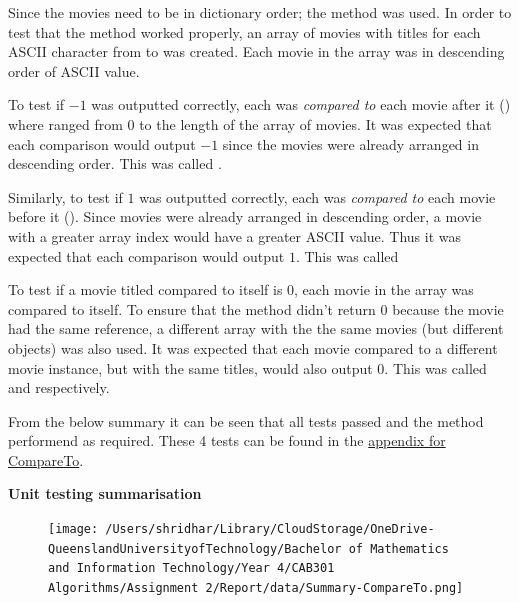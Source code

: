 \documentclass[a4paper]{article}
\begin{document}
\noindent
Since the movies need to be in dictionary order; the  method was used. In order to test that the method worked properly, an array of movies with titles for each ASCII character from  to \codeword{~} was created. Each movie in the array was in descending order of ASCII value. 
\vspace{3mm}

\noindent
To test if $-1$ was outputted correctly, each  was \textit{compared to} each movie after it () where  ranged from $0$ to the length of the array of movies. It was expected that each comparison would output $-1$ since the movies were already arranged in descending order. This was called .
\vspace{3mm}

\noindent
Similarly, to test if $1$ was outputted correctly, each  was \textit{compared to} each movie before it (). Since movies were already arranged in descending order, a movie with a greater array index would have a greater ASCII value. Thus it was expected that each comparison would output $1$. This was called 
\vspace{3mm}

\noindent
To test if a movie titled compared to itself is $0$, each movie in the array was compared to itself. To ensure that the method didn't return $0$ because the movie had the same reference, a different array with the the same movies (but different objects) was also used. It was expected that each movie compared to a different movie instance, but with the same titles, would also output $0$. This was called  and  respectively. 
\vspace{1mm}

\noindent
From the below summary it can be seen that all tests passed and the method performend as required. These 4 tests can be found in the \hyperlink{subsubsection.5.1.1}{appendix for CompareTo}.
\vspace{3mm}

\noindent
\textbf{Unit testing summarisation}
\begin{figure}[H]
   \texttt{[image: /Users/shridhar/Library/CloudStorage/OneDrive-QueenslandUniversityofTechnology/Bachelor of Mathematics and Information Technology/Year 4/CAB301 Algorithms/Assignment 2/Report/data/Summary-CompareTo.png]}
\end{figure}
\end{document}
